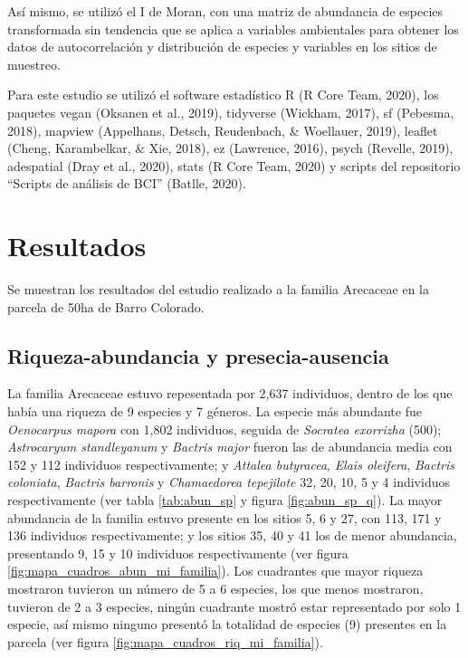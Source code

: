 \documentclass[11pt,]{article}
\begin{document}
Así mismo, se utilizó el I de Moran, con una matriz de abundancia de
especies transformada sin tendencia que se aplica a variables
ambientales para obtener los datos de autocorrelación y distribución de
especies y variables en los sitios de muestreo.

Para este estudio se utilizó el software estadístico R (R Core Team,
2020), los paquetes vegan (Oksanen et al., 2019), tidyverse (Wickham,
2017), sf (Pebesma, 2018), mapview (Appelhans, Detsch, Reudenbach, \&
Woellauer, 2019), leaflet (Cheng, Karambelkar, \& Xie, 2018), ez
(Lawrence, 2016), psych (Revelle, 2019), adespatial (Dray et al., 2020),
stats (R Core Team, 2020) y scripts del repositorio ``Scripts de
análisis de BCI'' (Batlle, 2020).

\section{Resultados}\label{resultados}

Se muestran los resultados del estudio realizado a la familia Arecaceae
en la parcela de 50ha de Barro Colorado.

\subsection{Riqueza-abundancia y
presecia-ausencia}\label{riqueza-abundancia-y-presecia-ausencia}

La familia Arecaceae estuvo repesentada por 2,637 individuos, dentro de
los que había una riqueza de 9 especies y 7 géneros. La especie más
abundante fue \emph{Oenocarpus mapora} con 1,802 individuos, seguida de
\emph{Socratea exorrizha} (500); \emph{Astrocaryum standleyanum} y
\emph{Bactris major} fueron las de abundancia media con 152 y 112
individuos respectivamente; y \emph{Attalea butyracea}, \emph{Elais
oleifera}, \emph{Bactris coloniata}, \emph{Bactris barronis} y
\emph{Chamaedorea tepejilote} 32, 20, 10, 5 y 4 individuos
respectivamente (ver tabla \ref{tab:abun_sp} y figura
\ref{fig:abun_sp_q}). La mayor abundancia de la familia estuvo presente
en los sitios 5, 6 y 27, con 113, 171 y 136 individuos respectivamente;
y los sitios 35, 40 y 41 los de menor abundancia, presentando 9, 15 y 10
individuos respectivamente (ver figura
\ref{fig:mapa_cuadros_abun_mi_familia}). Los cuadrantes que mayor
riqueza mostraron tuvieron un número de 5 a 6 especies, los que menos
mostraron, tuvieron de 2 a 3 especies, ningún cuadrante mostró estar
representado por solo 1 especie, así mismo ninguno presentó la totalidad
de especies (9) presentes en la parcela (ver figura
\ref{fig:mapa_cuadros_riq_mi_familia}).
\end{document}
